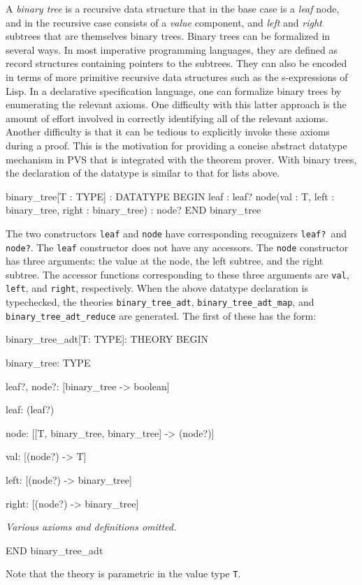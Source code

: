 \documentclass[11pt,twoside]{book}
\begin{document}
A \emph{binary tree} is a recursive data structure that in the base case
is a \emph{leaf} node, and in the recursive case consists of a \emph{value}
component, and \emph{left} and \emph{right} subtrees that are themselves
binary trees.  Binary 
trees can be formalized in  several ways.  In most imperative
programming languages, they are defined as record structures
containing pointers to the subtrees.  They can also be encoded in
terms of more primitive recursive data structures such as the
s-expressions of Lisp.  In a declarative specification language, one
can formalize binary trees by enumerating the relevant axioms.  One
difficulty with this latter approach is the amount of effort involved
in correctly identifying all of the relevant axioms.  Another difficulty
is that it can be tedious to explicitly invoke these axioms during a
proof.  This is the motivation for providing a concise abstract
datatype mechanism in PVS that is integrated with the theorem prover.
With binary trees, the declaration of the 
datatype is similar to that for lists above.
\begin{session*}
binary_tree[T : TYPE] : DATATYPE
BEGIN
  leaf : leaf?
  node(val : T, left : binary_tree, right : binary_tree) : node?
END binary_tree
\end{session*}
The two constructors \texttt{leaf} and \texttt{node} have corresponding
recognizers \texttt{leaf?}\ and \texttt{node?}\@.  The \texttt{leaf}
constructor does not have any accessors.  The \texttt{node} constructor
has three arguments: the value at the node, the left subtree, and the
right subtree.  The accessor functions corresponding to these three
arguments are \texttt{val}, \texttt{left}, and \texttt{right},
respectively.  When the above datatype declaration is typechecked, the
theories \texttt{binary\_tree\_adt}, \texttt{binary\_tree\_adt\_map}, and
\texttt{binary\_tree\_adt\_reduce} are generated.  The first of these has
the form:
\begin{session*}
binary_tree_adt[T: TYPE]: THEORY
  BEGIN
  
  binary_tree: TYPE
  
  leaf?, node?: [binary_tree -> boolean]
  
  leaf: (leaf?)
  
  node: [[T, binary_tree, binary_tree] -> (node?)]
  
  val: [(node?) -> T]
  
  left: [(node?) -> binary_tree]
  
  right: [(node?) -> binary_tree]
  
  \emph{Various axioms and definitions omitted.}

  END binary_tree_adt
\end{session*}
Note that the theory is parametric in the value type \texttt{T}.
\end{document}
